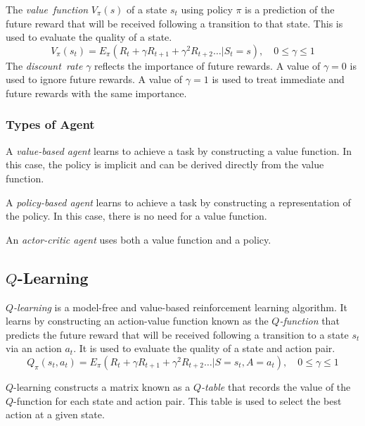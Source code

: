 The \emph{value~function} \( V_{\pi}\!\left(s\right) \) of a state \( s_{t} \) using policy \( \pi \) is a prediction of the future reward that will be received following a transition to that state.
This is used to evaluate the quality of a state.
\begin{equation*}
  V_{\pi}\!\left(s_{t}\right) = E_{\pi}\!\left( R_{t} + \gamma R_{t+1} + \gamma^{2} R_{t+2} \ldots \vert S_{t} = s \right), \quad 0 \leq \gamma \leq 1
\end{equation*}
The \emph{discount~rate} \( \gamma \) reflects the importance of future rewards.
A value of \( \gamma = 0 \) is used to ignore future rewards.
A value of \( \gamma = 1 \) is used to treat immediate and future rewards with the same importance.

\subsubsection{Types of Agent}

A \emph{value-based agent} learns to achieve a task by constructing a value function.
In this case, the policy is implicit and can be derived directly from the value function.

A \emph{policy-based agent} learns to achieve a task by constructing a representation of the policy.
In this case, there is no need for a value function.

An \emph{actor-critic agent} uses both a value function and a policy.

\subsection{\texorpdfstring{\( Q \)}{Q}-Learning}

\emph{\( Q \)-learning} is a model-free and value-based reinforcement learning algorithm.
It learns by constructing an action-value function known as the \emph{\( Q \)-function} that predicts the future reward that will be received following a transition to a state \( s_{t} \) via an action \( a_{t} \).
It is used to evaluate the quality of a state and action pair.
\begin{equation*}
  Q_{\pi}\!\left(s_t, a_{t}\right) = E_{\pi}\!\left( R_{t} + \gamma R_{t+1} + \gamma^{2} R_{t+2} \ldots \vert S = s_{t}, A = a_{t} \right), \quad 0 \leq \gamma \leq 1
\end{equation*}

\( Q \)-learning constructs a matrix known as a \emph{\( Q \)-table} that records the value of the \( Q \)-function for each state and action pair.
This table is used to select the best action at a given state.

